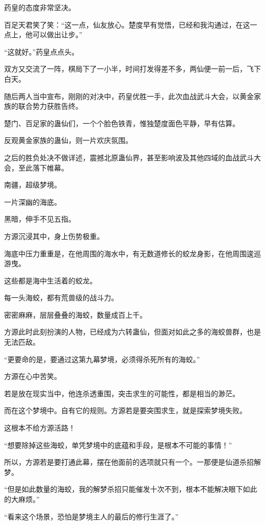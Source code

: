 
\begin{this_body}

药皇的态度非常坚决。

百足天君笑了笑：“这一点，仙友放心。楚度早有觉悟，已经和我沟通过，在这一点上，他可以做出让步。”

“这就好。”药皇点点头。

双方又交流了一阵，棋局下了一小半，时间打发得差不多，两仙便一前一后，飞下白天。

随后两人当中宣布，刚刚的对决中，药皇优胜一手，此次血战武斗大会，以黄金家族的联合势力获胜告终。

楚门、百足家的蛊仙们，一个个脸色铁青，惟独楚度面色平静，早有估算。

反观黄金家族的蛊仙，则一片欢庆氛围。

之后的胜负处决不做详述，震撼北原蛊仙界，甚至影响波及其他四域的血战武斗大会，至此落下帷幕。

南疆，超级梦境。

一片深幽的海底。

黑暗，伸手不见五指。

方源沉浸其中，身上伤势极重。

海底中压力重重是，在他周围的海水中，有无数道修长的蛟龙身影，在他周围逡巡游曳。

这些都是海中生活着的蛟龙。

每一头海蛟，都有荒兽级的战斗力。

密密麻麻，层层叠叠的海蛟，数量成百上千。

方源此时此刻扮演的人物，已经成为六转蛊仙，但面对如此之多的海蛟兽群，也是无法匹敌。

“更要命的是，要通过这第九幕梦境，必须得杀死所有的海蛟。”

方源在心中苦笑。

若是放在现实当中，他连杀透重围，突击求生的可能性，都是相当的渺茫。

而在这个梦境中。自有它的规则。方源若是要突围求生，就是探索梦境失败。

这根本不给方源活路！

“想要除掉这些海蛟，单凭梦境中的底蕴和手段，是根本不可能的事情！”

所以，方源若是要打通此幕，摆在他面前的选项就只有一个。一那便是仙道杀招解梦。

“但是如此数量的海蛟，我的解梦杀招只能催发十次不到，根本不能解决眼下如此的大麻烦。”

“看来这个场景，恐怕是梦境主人的最后的修行生涯了。”


\end{this_body}

